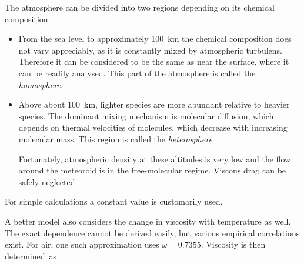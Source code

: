             \begin{example}
                The atmosphere can be divided into two regions depending on its chemical composition:
                \begin{itemize}
                    \item From the sea level to approximately \SI{100}{\kilo\metre} the chemical
                        composition does not vary appreciably, as it is constantly mixed by
                        atmospheric turbulens. Therefore it can be considered to
                        be the same as near the surface, where it can be readily analysed.
                        This part of the atmosphere is called the \emph{homosphere}.
                    \item Above about \SI{100}{\kilo\metre}, lighter species are more abundant
                        relative to heavier species. The dominant mixing mechanism is molecular diffusion,
                        which depends on thermal velocities of molecules, which decrease
                        with increasing molecular mass. This region is called the \emph{heterosphere}.

                        Fortunately, atmospheric density at these altitudes is very low
                        and the flow around the meteoroid is in the free-molecular regime.
                        Viscous drag can be safely neglected.
                \end{itemize}

            \end{example}

            For simple calculations a constant value is customarily used,

            A better model also considers the change in viscosity with temperature as well.
            The exact dependence cannot be derived easily, but various empirical correlations
            exist. For air, one such approximation \citep{tec-science-viscosity}
            uses $\omega = \num{0.7355}$. Viscosity is then determined~as

